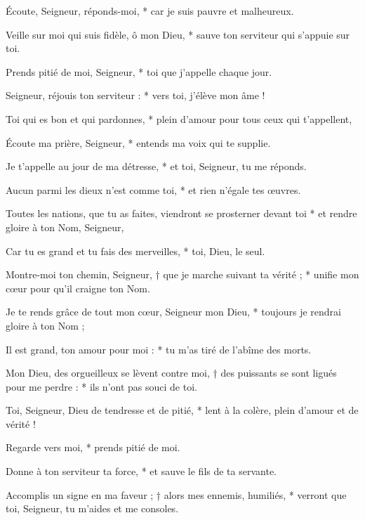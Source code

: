 \item Écoute, Seigneur, réponds-moi, * car je suis pauvre et malheureux.
\item Veille sur moi qui suis fidèle, ô mon Dieu, * sauve ton serviteur qui s'appuie sur toi.
\item Prends pitié de moi, Seigneur, * toi que j'appelle chaque jour.
\item Seigneur, réjouis ton serviteur : * vers toi, j'élève mon âme !
\item Toi qui es bon et qui pardonnes, * plein d'amour pour tous ceux qui t'appellent,
\item Écoute ma prière, Seigneur, * entends ma voix qui te supplie.
\item Je t'appelle au jour de ma détresse, * et toi, Seigneur, tu me réponds.
\item Aucun parmi les dieux n'est comme toi, * et rien n'égale tes œuvres.
\item Toutes les nations, que tu as faites, viendront se prosterner devant toi * et rendre gloire à ton Nom, Seigneur,
\item Car tu es grand et tu fais des merveilles, * toi, Dieu, le seul.
\item Montre-moi ton chemin, Seigneur, † que je marche suivant ta vérité ; * unifie mon cœur pour qu'il craigne ton Nom.
\item Je te rends grâce de tout mon cœur, Seigneur mon Dieu, * toujours je rendrai gloire à ton Nom ;
\item Il est grand, ton amour pour moi : * tu m'as tiré de l'abîme des morts.
\item Mon Dieu, des orgueilleux se lèvent contre moi, † des puissants se sont ligués pour me perdre : * ils n'ont pas souci de toi.
\item Toi, Seigneur, Dieu de tendresse et de pitié, * lent à la colère, plein d'amour et de vérité !
\item Regarde vers moi, * prends pitié de moi.
\item Donne à ton serviteur ta force, * et sauve le fils de ta servante.
\item Accomplis un signe en ma faveur ; † alors mes ennemis, humiliés, * verront que toi, Seigneur, tu m'aides et me consoles.
